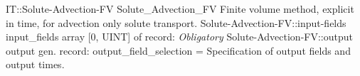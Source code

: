 \begin{RecordType}
	{IT::Solute-Advection-FV}
	{Solute{\_}Advection{\_}FV}
	{}%
	{}%
	{{{Finite volume method, explicit in time, for advection only solute transport.}%
}}
		\RecKey
			{Solute-Advection-FV::input-fields}
			{input{\_}fields}
			{{array [0, UINT] of }{record: }}{}
			{ \it{Obligatory}}
			{}
		\RecKey
			{Solute-Advection-FV::output}
			{output}
			{{gen. record: }}{{output{\_}field{\_}selection}{ = }}
			{ }
			{{{Specification of output fields and output times.}%
}}
\end{RecordType}
